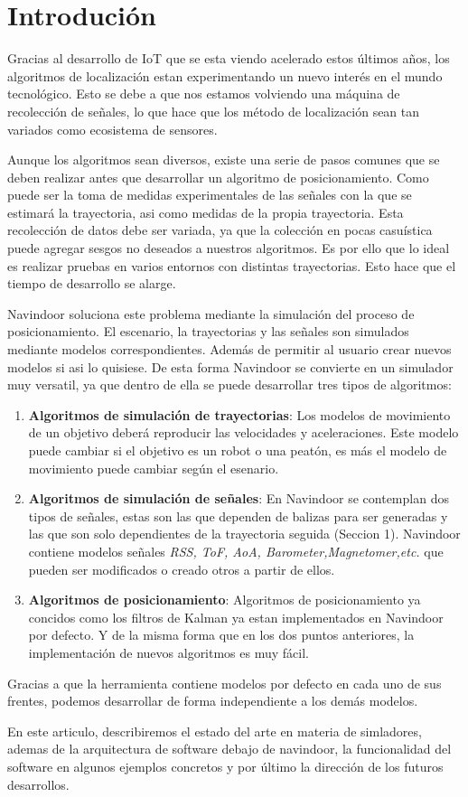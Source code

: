 \section{Introdución}

Gracias al desarrollo de IoT que se esta viendo acelerado estos últimos años, los algoritmos de localización estan experimentando un nuevo interés en el mundo tecnológico. Esto se debe a que nos estamos volviendo una máquina de recolección de señales, lo que hace que los método de localización sean tan variados como ecosistema de sensores. 

Aunque los algoritmos sean diversos, existe una serie de pasos comunes que se deben realizar antes que desarrollar un algoritmo de posicionamiento. Como puede ser la toma de medidas experimentales de las señales con la que se estimará la trayectoria, asi como medidas de la propia trayectoria. Esta recolección de datos debe ser variada, ya que la colección en pocas casuística puede agregar sesgos no deseados a nuestros algoritmos. Es por ello que lo ideal es realizar pruebas en varios entornos con distintas trayectorias. Esto hace que el tiempo de desarrollo se alarge. 

Navindoor soluciona este problema mediante la simulación del proceso de posicionamiento. El escenario, la trayectorias y las señales son simulados mediante modelos correspondientes. Además de permitir al usuario crear nuevos modelos si asi lo quisiese. De esta forma Navindoor se convierte en un simulador muy versatil, ya que dentro de ella se puede desarrollar tres tipos de algoritmos:  \cite{Correa2017} 
\begin{enumerate}
    \item \textbf{Algoritmos de simulación de trayectorias}: Los modelos de movimiento de un objetivo deberá reproducir las velocidades y aceleraciones. Este modelo puede cambiar si el objetivo es un robot o una peatón, es más el modelo de movimiento puede cambiar según el esenario.
    \item \textbf{Algoritmos de simulación de señales}: En Navindoor se contemplan dos tipos de señales, estas son las que dependen de  balizas para ser generadas y las que son solo dependientes de la trayectoria seguida (Seccion 1). Navindoor contiene modelos señales  \emph{RSS, ToF, AoA, Barometer,Magnetomer,etc.} que pueden ser modificados o creado otros a partir de ellos.
    \item \textbf{Algoritmos de posicionamiento}: Algoritmos de posicionamiento ya concidos como los filtros de Kalman ya estan implementados en Navindoor por defecto. Y de la misma forma que en los dos puntos anteriores, la implementación de nuevos algoritmos es muy fácil.
\end{enumerate}

Gracias a que la herramienta contiene modelos por defecto en cada uno de sus frentes, podemos desarrollar de forma independiente a los demás modelos. 

En este articulo, describiremos el estado del arte en materia de simladores, ademas de la arquitectura de software debajo de navindoor, la funcionalidad del software en algunos ejemplos concretos y por último la dirección de los futuros desarrollos.  

